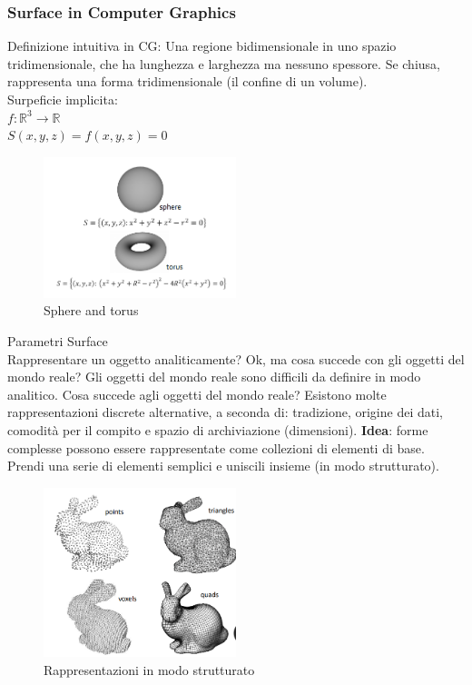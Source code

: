 \subsubsection{Surface in Computer Graphics}
Definizione intuitiva in CG:
Una regione bidimensionale in uno spazio tridimensionale, che ha lunghezza e larghezza ma nessuno spessore.
Se chiusa, rappresenta una forma tridimensionale (il confine di un volume).
\\ 
Surpeficie implicita:
\\
$f : \mathbb{R}^3 \rightarrow \mathbb{R}$
\\
$S(x, y, z) = f(x, y, z) = 0$
\begin{figure}[H]
    \centering
    \includegraphics[width=0.5\textwidth]{images/Sfera.png} 
    \caption{Sphere and torus}
    \label{fig:immagine}
\end{figure}
Parametri Surface
\\
Rappresentare un oggetto analiticamente? Ok, ma cosa succede con gli oggetti del mondo reale? Gli oggetti del mondo reale sono difficili da definire in modo analitico.
Cosa succede agli oggetti del mondo reale?
Esistono molte rappresentazioni discrete alternative, a seconda di: tradizione, origine dei dati, comodità per il compito e spazio di archiviazione (dimensioni).
\textbf{Idea}: forme complesse possono essere rappresentate come collezioni di elementi di base. Prendi una serie di elementi semplici e uniscili insieme (in modo strutturato).
\begin{figure}[H]
    \centering
    \includegraphics[width=0.5\textwidth]{images/structRep.png} 
    \caption{Rappresentazioni in modo strutturato}
    \label{fig:immagine}
\end{figure}
